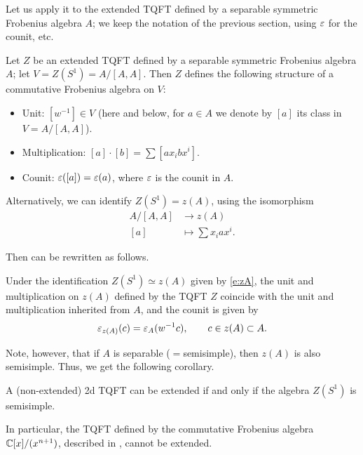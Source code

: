 Let us apply it to the extended TQFT defined by a separable symmetric Frobenius
algebra $A$; we keep the notation of the previous section, using $\varepsilon$ for the
counit, etc.

\begin{theorem}\label{t:centerTQFT}
  Let $Z$ be an extended TQFT defined by a separable symmetric Frobenius algebra
  $A$; let $V=Z(S^1)=A/[A,A]$. Then $Z$ defines the following structure of
  a commutative Frobenius algebra on $V$:
  \begin{itemize}
    \item Unit: $[w^{-1}]\in V$ \textup{(}here and below, for $a\in A$ we denote by
        $[a]$ its class in $V=A/[A,A]$\textup{)}.
    \item Multiplication: $[a]\cdot [b]=\sum [ax_ibx^i]$.
    \item Counit: $\varepsilon([a])=\varepsilon (a)$, where $\varepsilon$ is the counit in $A$.
  \end{itemize}
\end{theorem}

Alternatively, we can identify $Z(S^1)=z(A)$, using the isomorphism
\begin{equation}\label{e:zA}
  \begin{aligned}
    A/[A,A]&\to z(A)\\
     [a]&\mapsto \sum x_iax^i.
   \end{aligned}
\end{equation}

Then  can be rewritten as follows.
\begin{theorem} \label{t:centerTQFT2}
  Under the identification $Z(S^1)\simeq z(A)$ given by \eqref{e:zA},
  the unit and multiplication on $z(A)$ defined by the TQFT $Z$ coincide with the unit and
  multiplication inherited from $A$, and the counit is given by
  $$
    \varepsilon_{z(A)} (c)=\varepsilon_A(w^{-1}c), \qquad c\in z(A)\subset A.
  $$
\end{theorem}


Note, however, that if $A$ is separable ($=$semisimple), then $z(A)$ is
also semisimple. Thus, we get the following corollary.
\begin{corollary}
  A \textup{(}non-extended\textup{)} 2d TQFT can be extended if and only if the algebra $Z(S^1)$
  is semisimple.
\end{corollary}
In particular, the TQFT defined by the commutative
Frobenius algebra $\mathbb{C}[x]/(x^{n+1})$, described in ,
cannot be extended.

